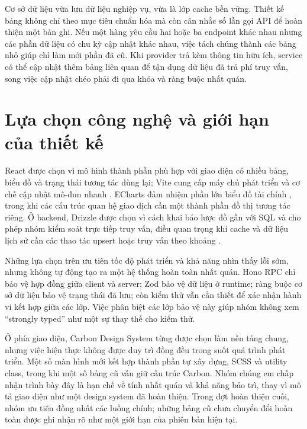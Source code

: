 Cơ sở dữ liệu vừa lưu dữ liệu nghiệp vụ, vừa là lớp cache bền vững. Thiết kế bảng không chỉ theo mục tiêu chuẩn hóa mà còn cân nhắc số lần gọi API để hoàn thiện một bản ghi. Nếu một hàng yêu cầu hai hoặc ba endpoint khác nhau nhưng các phần dữ liệu có chu kỳ cập nhật khác nhau, việc tách chúng thành các bảng nhỏ giúp chỉ làm mới phần đã cũ. Khi provider trả kèm thông tin hữu ích, service có thể cập nhật thêm bảng liên quan để tận dụng dữ liệu đã trả phí truy vấn, song việc cập nhật chéo phải đi qua khóa và ràng buộc nhất quán.



\section{Lựa chọn công nghệ và giới hạn của thiết kế}

React được chọn vì mô hình thành phần phù hợp với giao diện có nhiều bảng, biểu đồ và trạng thái tương tác dùng lại; Vite cung cấp máy chủ phát triển và cơ chế cập nhật mô-đun nhanh \cite{react,vite}. ECharts đảm nhiệm phần lớn biểu đồ tài chính \cite{echarts}, trong khi các cấu trúc quan hệ giao dịch cần một thành phần đồ thị tương tác riêng. Ở backend, Drizzle được chọn vì cách khai báo lược đồ gần với SQL và cho phép nhóm kiểm soát trực tiếp truy vấn, điều quan trọng khi cache và dữ liệu lịch sử cần các thao tác upsert hoặc truy vấn theo khoảng \cite{drizzle}.

Những lựa chọn trên ưu tiên tốc độ phát triển và khả năng nhìn thấy lỗi sớm, nhưng không tự động tạo ra một hệ thống hoàn toàn nhất quán. Hono RPC chỉ bảo vệ hợp đồng giữa client và server; Zod bảo vệ dữ liệu ở runtime; ràng buộc cơ sở dữ liệu bảo vệ trạng thái đã lưu; còn kiểm thử vẫn cần thiết để xác nhận hành vi kết hợp giữa các lớp. Việc phân biệt các lớp bảo vệ này giúp nhóm không xem ``strongly typed'' như một sự thay thế cho kiểm thử.

Ở phía giao diện, Carbon Design System từng được chọn làm nền tảng chung, nhưng việc hiện thực không được duy trì đồng đều trong suốt quá trình phát triển. Một số màn hình mới kết hợp thành phần tự xây dựng, SCSS và utility class, trong khi một số bảng cũ vẫn giữ cấu trúc Carbon. Nhóm chúng em chấp nhận trình bày đây là hạn chế về tính nhất quán và khả năng bảo trì, thay vì mô tả giao diện như một design system đã hoàn thiện. Trong đợt hoàn thiện cuối, nhóm ưu tiên đồng nhất các luồng chính; những bảng cũ chưa chuyển đổi hoàn toàn được ghi nhận rõ như một giới hạn của phiên bản hiện tại.


